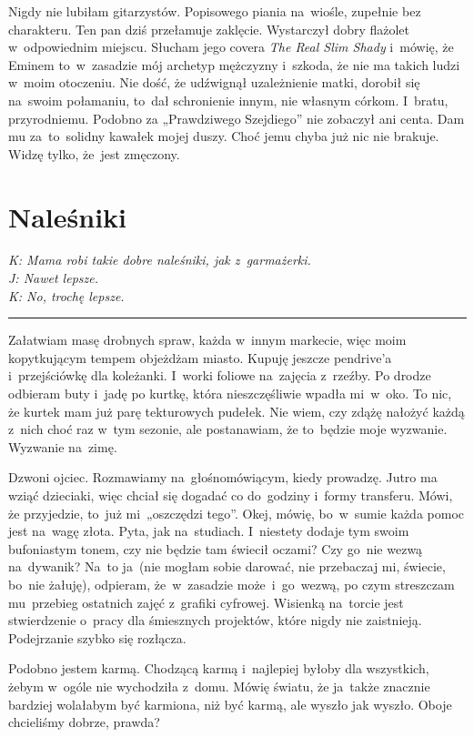 \documentclass[9pt, a5paper]{memoir}
\begin{document}
Nigdy nie lubiłam gitarzystów. Popisowego piania na~wiośle, zupełnie bez charakteru. Ten pan dziś przełamuje zaklęcie. Wystarczył dobry flażolet w~odpowiednim miejscu. Słucham jego covera \textit{The Real Slim Shady} i~mówię, że Eminem to~w~zasadzie mój archetyp mężczyzny i~szkoda, że nie ma takich ludzi w~moim otoczeniu. Nie dość, że udźwignął uzależnienie matki, dorobił się na~swoim połamaniu, to~dał schronienie innym, nie własnym córkom. I~bratu, przyrodniemu. Podobno za „Prawdziwego Szejdiego” nie zobaczył ani centa. Dam mu za~to~solidny kawałek mojej duszy. Choć jemu chyba już nic nie brakuje. Widzę tylko, że~jest zmęczony.

\newpage
\section{Naleśniki}
{
\itshape
K: Mama robi takie dobre naleśniki, jak z~garmażerki.\\
J: Nawet lepsze.\\
K: No, trochę lepsze.
}

\fancybreak{* \quad * \quad *}

Załatwiam masę drobnych spraw, każda w~innym markecie, więc moim kopytkującym tempem objeżdżam miasto. Kupuję jeszcze pendrive'a i~przejściówkę dla koleżanki. I~worki foliowe na~zajęcia z~rzeźby. Po drodze odbieram buty i~jadę po kurtkę, która nieszczęśliwie wpadła mi~w~oko. To nic, że kurtek mam już parę tekturowych pudełek. Nie wiem, czy zdążę nałożyć każdą z~nich choć raz w~tym sezonie, ale postanawiam, że to~będzie moje wyzwanie. Wyzwanie na~zimę.

Dzwoni ojciec. Rozmawiamy na~głośnomówiącym, kiedy prowadzę. Jutro ma wziąć dzieciaki, więc chciał się dogadać co do~godziny i~formy transferu. Mówi, że przyjedzie, to~już mi~„oszczędzi tego”. Okej, mówię, bo~w~sumie każda pomoc jest na~wagę złota. Pyta, jak na~studiach. I~niestety dodaje tym swoim bufoniastym tonem, czy nie będzie tam świecił oczami? Czy go~nie wezwą na~dywanik? Na~to ja~(nie mogłam sobie darować, nie przebaczaj mi, świecie, bo~nie żałuję), odpieram, że~w~zasadzie może~i~go~wezwą, po czym streszczam mu~przebieg ostatnich zajęć z~grafiki cyfrowej. Wisienką na~torcie jest stwierdzenie o~pracy dla śmiesznych projektów, które nigdy nie zaistnieją. Podejrzanie szybko się rozłącza.

Podobno jestem karmą. Chodzącą karmą i~najlepiej byłoby dla wszystkich, żebym w~ogóle nie wychodziła z~domu. Mówię światu, że ja~także znacznie bardziej wolałabym być karmiona, niż być karmą, ale wyszło jak wyszło. Oboje chcieliśmy dobrze, prawda?
\end{document}

